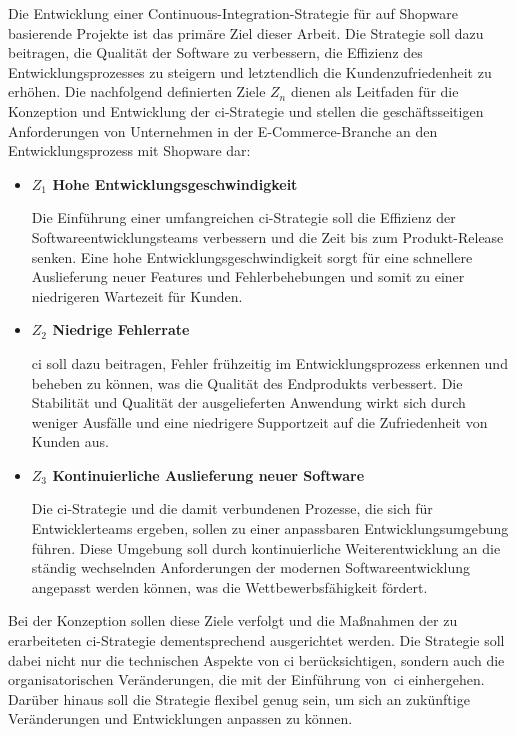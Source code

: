 Die Entwicklung einer Continuous-Integration-Strategie für auf Shopware basierende Projekte ist das primäre Ziel
dieser Arbeit.
Die Strategie soll dazu beitragen, die Qualität der Software zu verbessern, die Effizienz des Entwicklungsprozesses zu
steigern und letztendlich die Kundenzufriedenheit zu erhöhen.
Die nachfolgend definierten Ziele $Z_n$ dienen als Leitfaden für die Konzeption und Entwicklung der
\acrshort{ci}-Strategie und stellen die geschäftsseitigen Anforderungen von Unternehmen in der E-Commerce-Branche an den
Entwicklungsprozess mit Shopware dar:

\begin{itemize}
    \item {
        \textbf{$Z_1$ Hohe Entwicklungsgeschwindigkeit}\par
        Die Einführung einer umfangreichen \acrshort{ci}-Strategie soll die Effizienz der Softwareentwicklungsteams
        verbessern und die Zeit bis zum Produkt-Release senken.
        Eine hohe Entwicklungsgeschwindigkeit sorgt für eine schnellere Auslieferung neuer Features und Fehlerbehebungen
        und somit zu einer niedrigeren Wartezeit für Kunden.
    }

    \item {
        \textbf{$Z_2$ Niedrige Fehlerrate}\par
        \acrshort{ci} soll dazu beitragen, Fehler frühzeitig im Entwicklungsprozess erkennen und beheben zu können, was
        die Qualität des Endprodukts verbessert.
        Die Stabilität und Qualität der ausgelieferten Anwendung wirkt sich durch weniger Ausfälle und eine
        niedrigere Supportzeit auf die Zufriedenheit von Kunden aus.
    }

    \item{
        \textbf{$Z_3$ Kontinuierliche Auslieferung neuer Software}\par
        Die \acrshort{ci}-Strategie und die damit verbundenen Prozesse, die sich für Entwicklerteams ergeben, sollen
        zu einer anpassbaren Entwicklungsumgebung führen.
        Diese Umgebung soll durch kontinuierliche Weiterentwicklung an die ständig wechselnden Anforderungen der
        modernen Softwareentwicklung angepasst werden können, was die Wettbewerbsfähigkeit fördert.
    }
\end{itemize}

Bei der Konzeption sollen diese Ziele verfolgt und die Maßnahmen der zu erarbeiteten \acrshort{ci}-Strategie
dementsprechend ausgerichtet werden.
Die Strategie soll dabei nicht nur die technischen Aspekte von \acrlong{ci} berücksichtigen, sondern auch die
organisatorischen Veränderungen, die mit der Einführung von\ \acrshort{ci} einhergehen.
Darüber hinaus soll die Strategie flexibel genug sein, um sich an zukünftige Veränderungen und Entwicklungen anpassen
zu können.

